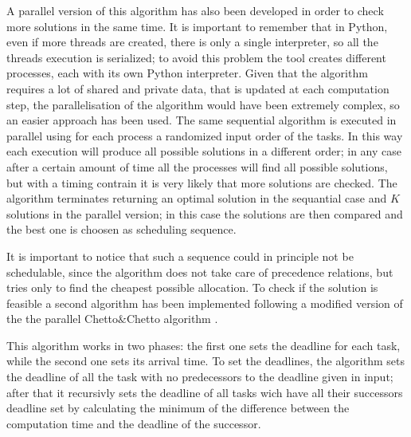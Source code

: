 \documentclass[a4paper,11pt,oneside]{book}
\begin{document}
A parallel version of this algorithm has also been developed in order to check more solutions in the same time. It is important to remember that in Python, even if more threads are created, there is only a single interpreter, so all the threads execution is serialized; to avoid this problem the tool creates different processes, each with its own Python interpreter. Given that the algorithm requires a lot of shared and private data, that is updated at each computation step, the parallelisation of the algorithm would have been extremely complex, so an easier approach has been used. The same sequential algorithm is executed in parallel using for each process a randomized input order of the tasks. In this way each execution will produce all possible solutions in a different order; in any case after a certain amount of time all the processes will find all possible solutions, but with a timing contrain it is very likely that  more solutions are checked. The algorithm terminates returning an optimal solution in the sequantial case and $K$ solutions in the parallel version; in this case the solutions are then compared and the best one is choosen as scheduling sequence.

It is important to notice that such a sequence could in principle not be schedulable, since the algorithm does not take care of precedence relations, but tries only to find the cheapest possible allocation. To check if the solution is feasible a second algorithm has been implemented following a modified version of the the parallel Chetto$\&$Chetto algorithm \cite{bbw2}.

This algorithm works in two phases: the first one sets the deadline for each task, while the second one sets its arrival time. To set the deadlines, the algorithm sets the deadline of all the task with no predecessors to the deadline given in input; after that it recursivly sets the deadline of all tasks wich have all their successors deadline set by calculating the minimum of the difference between the computation time and the deadline of the successor. 
\end{document}
